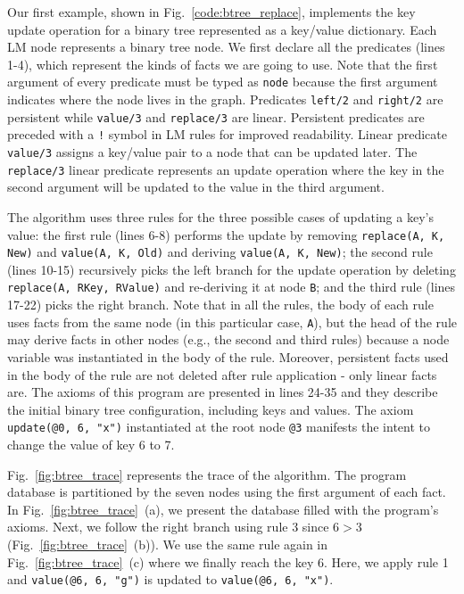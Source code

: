 Our first example, shown in Fig.~\ref{code:btree_replace}, implements the key
update operation for a binary tree represented as a key/value dictionary. Each
LM node represents a binary tree node.  We first declare all the predicates
(lines 1-4), which represent the kinds of facts we are going to use. Note that
the first argument of every predicate must be typed as \texttt{node} because the
first argument indicates where the node lives in the graph. Predicates
\texttt{left/2} and \texttt{right/2} are persistent while \texttt{value/3} and
\texttt{replace/3} are linear. Persistent predicates are preceded with a
\texttt{!} symbol in LM rules for improved readability. Linear predicate
\texttt{value/3} assigns a key/value pair to a node that can be updated later.
The \texttt{replace/3} linear predicate represents an update operation where the
key in the second argument will be updated to the value in the third argument.

The algorithm uses three rules for the three possible cases of updating a key's
value: the first rule (lines 6-8) performs the update by removing
\texttt{replace(A, K, New)} and \texttt{value(A, K, Old)} and deriving
\texttt{value(A, K, New)}; the second rule (lines 10-15) recursively picks the
left branch for the update operation by deleting \texttt{replace(A, RKey,
RValue)} and re-deriving it at node \texttt{B}; and the third rule (lines
17-22) picks the right branch. Note that in all the rules, the body of
each rule uses facts from the same node (in this particular case,
\texttt{A}), but the head of the rule may derive facts in other
nodes (e.g., the second and third rules) because a node variable was
instantiated in the body of the rule. Moreover, persistent facts used in
the body of the rule are not deleted after rule application - only linear
facts are. The axioms of this program are presented in lines 24-35 and
they describe the initial binary tree configuration, including keys and
values.  The axiom \texttt{update(@0, 6, "x")} instantiated at the root
node \texttt{@3} manifests the intent to change the value of key 6 to 7.

Fig.~\ref{fig:btree_trace} represents the trace of the algorithm. The program
database is partitioned by the seven nodes using the first argument of each
fact. In Fig.~\ref{fig:btree_trace}~(a), we present the database filled with the
program's axioms. Next, we follow the right branch using rule 3 since $6 > 3$
(Fig.~\ref{fig:btree_trace}~(b)).  We use the same rule again in
Fig.~\ref{fig:btree_trace}~(c) where we finally reach the key 6. Here, we apply
rule 1 and \texttt{value(@6, 6, "g")} is updated to \texttt{value(@6, 6, "x")}.

